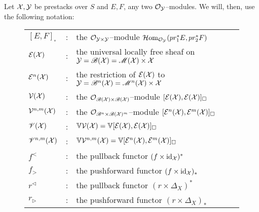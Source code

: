 \documentclass[11pt]{amsart}
\begin{document}
\begin{notn}
Let $\mathcal{X}, \mathcal{Y}$ be prestacks over $S$ and $E, F$, any two
$\mathcal{O}_\mathcal{Y}$--modules. We will, then, use the following notation:
\begin{figure}[H]
\begin{tabularx}{\textwidth}{l c l}
$[E, F]_\square$ & : & the $\mathcal{O}_{\mathcal{Y} \times \mathcal{Y}}$--module
  $\mathcal{H}\mathrm{om}_{\mathcal{O}_{\mathcal{Y}}}(pr_1^*E, pr_2^*F)$ \\
$\mathcal{E}(\mathcal{X})$ & : & the universal locally free sheaf on
  $\mathcal{Y} = \mathscr{B}(\mathcal{X}) = \mathscr{M}(\mathcal{X}) \times \mathcal{X}$ \\
$\mathcal{E}^n(\mathcal{X})$ & : & the restriction of $\mathcal{E}(\mathcal{X})$ to
  $\mathcal{Y} = \mathscr{B}^n(\mathcal{X}) = \mathscr{M}^n(\mathcal{X}) \times \mathcal{X}$ \\
$\mathcal{V}(\mathcal{X})$ & : & the $\mathcal{O}_{\mathscr{B}(\mathcal{X}) \times \mathscr{B}(\mathcal{X})}$--module
  $[\mathcal{E}(\mathcal{X}), \mathcal{E}(\mathcal{X})]_\square$ \\
$\mathcal{V}^{n, m}(\mathcal{X})$ & : & the $\mathcal{O}_{\mathscr{B}^n \times \mathscr{B}(\mathcal{X})^m}$--module
  $[\mathcal{E}^n(\mathcal{X}), \mathcal{E}^m(\mathcal{X})]_\square$ \\
$\mathscr{V}(\mathcal{X})$ & : & $\mathbb{V}\mathcal{V}(\mathcal{X}) = \mathbb{V} [\mathcal{E}(\mathcal{X}), \mathcal{E}(\mathcal{X})]_\square$ \\
$\mathscr{V}^{n, m}(\mathcal{X})$ & : &
  $\mathbb{V}\mathcal{V}^{n, m}(\mathcal{X}) = \mathbb{V} [\mathcal{E}^n(\mathcal{X}), \mathcal{E}^m(\mathcal{X})]_\square$  \\
$f^<$ & : & the pullback functor $(f \times \mathrm{id}_\mathcal{X})^*$ \\
$f_>$ & : & the pushforward functor $(f \times \mathrm{id}_\mathcal{X})_*$ \\
$r^\lhd$ & : & the pullback functor $(r \times \Delta_X)^*$ \\
$r_\rhd$ & : & the pushforward functor $(r \times \Delta_X)_*$
\end{tabularx}
\end{figure}
\end{notn}
\end{document}
